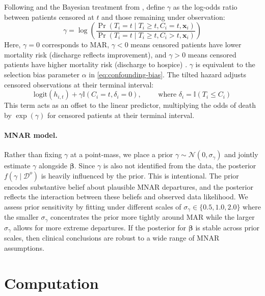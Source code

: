 \documentclass[twoside,11pt]{article}
\newcommand{\ind}{\mathbb{I}}
\newcommand{\bx}{\mathbf{x}}
\begin{document}
Following \citet{scharfstein1999} and the Bayesian treatment from \citet{daniels2008}, define \(\gamma\) as the log-odds ratio between patients censored at \(t\) and those remaining under observation:
\begin{equation}
    \gamma = \log\left( \frac{\Pr( T_i = t \mid T_i \geq t, C_i = t, \bx_i)}{\Pr( T_i = t \mid T_i \geq t, C_i > t, \bx_i)} \right)
\end{equation}
Here, $\gamma = 0$ corresponds to MAR, $\gamma < 0$ means censored patients have lower mortality risk (discharge reflects improvement), and $\gamma > 0$ means censored patients have higher mortality risk (discharge to hospice) \citep{oganisian}. $\gamma$ is equivalent to the selection bias parameter $\alpha$ in \eqref{eq:confounding-bias}. The tilted hazard adjusts censored observations at their terminal interval:
\begin{equation}\label{eq:tilted-hazard}
    \mathrm{logit}(h_{i,t}) + \gamma \ind(C_i = t, \delta_i = 0), \qquad \text{ where } \delta_i = \ind(T_i \le C_i)
\end{equation}
This term acts as an offset to the linear predictor, multiplying the odds of death by \(\exp(\gamma)\) for censored patients at their terminal interval. 
 
\paragraph{MNAR model.}
Rather than fixing \(\gamma\) at a point-mass, we place a prior \(\gamma \sim \mathcal{N}(0, \sigma_\gamma)\) and jointly estimate \(\gamma\) alongside \(\boldsymbol{\beta}\). Since \(\gamma\) is also not identified from the data, the posterior \(f(\gamma \mid \mathcal{D}^o)\) is heavily influenced by the prior. This is intentional. The prior encodes substantive belief about plausible MNAR departures, and the posterior reflects the interaction between these beliefs and observed data likelihood. We assess prior sensitivity by fitting under different scales of \(\sigma_\gamma \in \{ 0.5, 1.0, 2.0\}\) where the smaller \(\sigma_\gamma\) concentrates the prior more tightly around MAR while the larger \(\sigma_\gamma\) allows for more extreme departures. If the posterior for \(\boldsymbol{\beta}\) is stable across prior scales, then clinical conclusions are robust to a wide range of MNAR assumptions. 

 
\section{Computation} \label{sc:computation}
\end{document}
